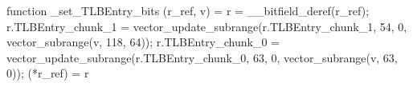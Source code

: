 function _set_TLBEntry_bits (r_ref, v) = {
    r = __bitfield_deref(r_ref);
    r.TLBEntry_chunk_1 = vector_update_subrange(r.TLBEntry_chunk_1, 54, 0, vector_subrange(v, 118, 64));
    r.TLBEntry_chunk_0 = vector_update_subrange(r.TLBEntry_chunk_0, 63, 0, vector_subrange(v, 63, 0));
    (*r_ref) = r
}

